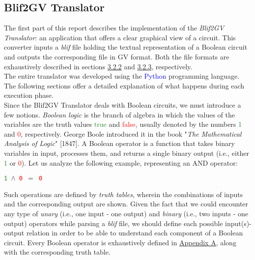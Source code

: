 \documentclass[]{usiinfbachelorproject}
\begin{document}
\subsection{Blif2GV Translator}\label{subsec:blif2gv-translator}
The first part of this report describes the implementation of the \textit{Blif2GV Translator}: an application that offers a clear graphical view of a circuit. This converter inputs a \textit{blif} file holding the textual representation of a Boolean circuit and outputs the corresponding file in GV format. Both the file formats are exhaustively described in sections \hyperref[subsubsec:blif-format]{3.2.2} and \hyperref[subsubsec:gv-format]{3.2.3}, respectively. \\
The entire translator was developed using the \textcolor{blue}{Python} \cite{py} programming language. \\
The following sections offer a detailed explanation of what happens during each execution phase. \\
Since the Blif2GV Translator deals with Boolean circuits, we must introduce a few notions. \textit{Boolean logic} is the branch of algebra in which the values of the variables are the truth values \textcolor{ForestGreen}{true} and \textcolor{red}{false}, usually denoted by the numbers \textcolor{ForestGreen}{1} and \textcolor{red}{0}, respectively. George Boole introduced it in the book "\textit{The Mathematical Analysis of Logic}" [1847]. A Boolean operator is a function that takes binary variables in input, processes them, and returns a single binary output (i.e., either \textcolor{ForestGreen}{1} or \textcolor{red}{0}). Let us analyze the following example, representing an AND operator:
\begin{center}
    \texttt{\textcolor{ForestGreen}{1} $\land$ \textcolor{red}{0} $=$ \textcolor{red}{0}}
\end{center}
Such operations are defined by \textit{truth tables}, wherein the combinations of inputs and the corresponding output are shown.  Given the fact that we could encounter any type of \textit{unary} (i.e., one input - one output) and \textit{binary} (i.e., two inputs - one output) operators while parsing a \textit{blif} file, we should define each possible input(s)-output relation in order to be able to understand each component of a Boolean circuit. Every Boolean operator is exhaustively defined in \hyperref[section:operators]{Appendix A}, along with the corresponding truth table.
\end{document}
